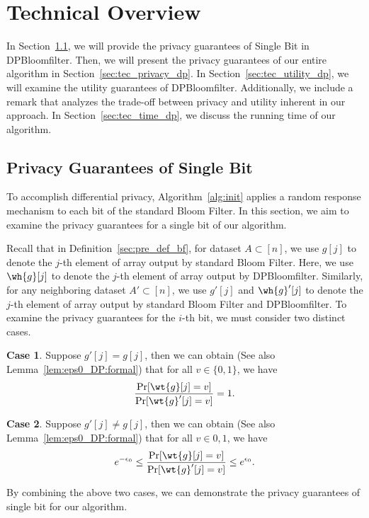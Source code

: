 \section{Technical Overview}\label{sec:tech_overview}
In Section~\ref{sec:tec_privacy_sb}, we will provide the privacy guarantees of Single Bit in DPBloomfilter. Then, we will present the privacy guarantees of our entire algorithm in Section~\ref{sec:tec_privacy_dp}. In Section~\ref{sec:tec_utility_dp}, we will examine the utility guarantees of DPBloomfilter. Additionally, we include a remark that analyzes the trade-off between privacy and utility inherent in our approach. In Section~\ref{sec:tec_time_dp}, we discuss the running time of our algorithm.


\subsection{Privacy Guarantees of Single Bit}\label{sec:tec_privacy_sb}

To accomplish differential privacy, Algorithm~\ref{alg:init} applies a random response mechanism to each bit of the standard Bloom Filter. In this section, we aim to examine the privacy guarantees for a single bit of our algorithm.

Recall that in Definition~\ref{sec:pre_def_bf}, for dataset $A \subset [n]$, we use $g[j]$  to denote the $j$-th element of array output by standard Bloom Filter. Here, we use $\wh{g}[j]$ to denote the $j$-th element of array output by DPBloomfilter. Similarly, for any neighboring dataset $A' \subset [n]$, we use $g'[j]$ and $\wh{g}'[j]$ to denote the $j$-th element of array output by standard Bloom Filter and DPBloomfilter. 
To examine the privacy guarantees for the $i$-th bit, we must consider two distinct cases.

{\bf Case 1}. Suppose $g'[j] = g[j]$, then we can obtain (See also Lemma~\ref{lem:eps0_DP:formal}) that  for all $v \in \{0,1\}$, we have
\begin{align*}
    \frac{\Pr[\wt{g}[j]=v]}{\Pr[\wt{g}'[j]=v]} = 1.
\end{align*}

{\bf Case 2}. Suppose $g'[j] \neq g[j]$, then we can obtain (See also Lemma~\ref{lem:eps0_DP:formal}) that for all $v \in {0,1}$, we have
\begin{align*}
    e^{-\epsilon_{0}} \leq \frac{\Pr[\wt{g}[j]=v]}{\Pr[\wt{g}'[j]=v]} \leq e^{\epsilon_{0}}.
\end{align*}

By combining the above two cases, we can demonstrate the privacy guarantees of single bit for our algorithm.

